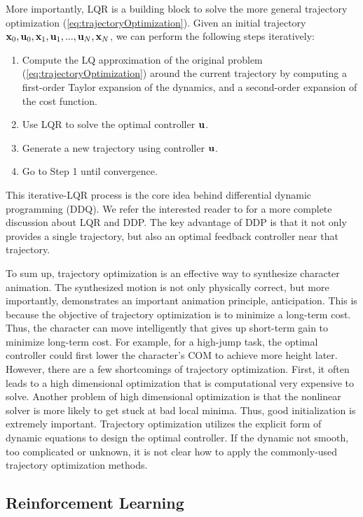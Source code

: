 More importantly, LQR is a building block to solve the more general trajectory optimization (\ref{eq:trajectoryOptimization}). Given an initial trajectory $\mathbf{x}_0, \mathbf{u}_0, \mathbf{x}_1, \mathbf{u}_1, ... , \mathbf{u}_N, \mathbf{x}_N$, we can perform the following steps iteratively:
\begin{enumerate}
\item{Compute the LQ approximation of the original problem (\ref{eq:trajectoryOptimization}) around the current trajectory by computing a first-order Taylor expansion of the dynamics, and a second-order expansion of the cost function.}
\item{Use LQR to solve the optimal controller $\mathbf{u}$.}
\item{Generate a new trajectory using controller $\mathbf{u}$.}
  \item{Go to Step 1 until convergence.}
\end{enumerate}
This iterative-LQR process is the core idea behind differential dynamic programming (DDQ). We refer the interested reader to \cite{} for a more complete discussion about LQR and DDP. The key advantage of DDP is that it not only provides a single trajectory, but also an optimal feedback controller near that trajectory.

To sum up, trajectory optimization is an effective way to synthesize character animation. The synthesized motion is not only physically correct, but more importantly, demonstrates an important animation principle, anticipation. This is because the objective of trajectory optimization is to minimize a long-term cost. Thus, the character can move intelligently that gives up short-term gain to minimize long-term cost. For example, for a high-jump task, the optimal controller could first lower the character's COM to achieve more height later. However, there are a few shortcomings of trajectory optimization. First, it often leads to a high dimensional optimization that is computational very expensive to solve. Another problem of high dimensional optimization is that the nonlinear solver is more likely to get stuck at bad local minima. Thus, good initialization is extremely important. Trajectory optimization utilizes the explicit form of dynamic equations to design the optimal controller. If the dynamic not smooth, too complicated or unknown, it is not clear how to apply the commonly-used trajectory optimization methods.


\subsection{Reinforcement Learning}


